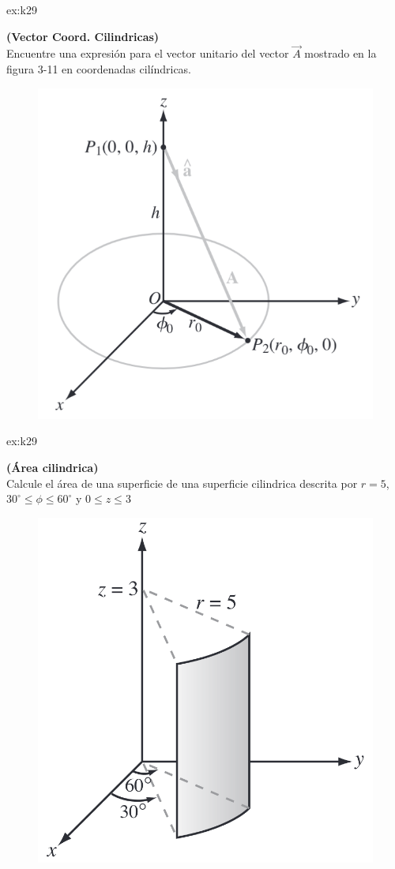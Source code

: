  \begin{multicols}{2}

    \begin{excercise}[][][$\vec{e}_A=\displaystyle{\frac{r_0\vec{e}_r-h\vec{k}}{\sqrt{r_0^2+h^2$}}}]{ex:k29}{ \textbf{(Vector Coord. Cilindricas)}\\
            Encuentre una expresión para el vector unitario del vector $\vec{A}$ mostrado en la figura 3-11 en coordenadas cilíndricas.
            \begin{figure}[H]
                \centering
                \includegraphics[width=0.7\linewidth]{img/01_electric-field/1.png}
            \end{figure}
         }
    \end{excercise}
    
    \begin{excercise}[][][$S=\displaystyle{\frac{5\pi}{2}}$]{ex:k29}{ \textbf{(Área cilindrica)}\\
            Calcule el área de una superficie de una superficie cilindrica descrita por $r=5$, $30^\circ\leq\phi\leq 60^\circ$ y $0\leq z\leq 3$            
            \begin{figure}[H]
                \centering
                \includegraphics[width=0.7\linewidth]{img/01_electric-field/2.png}
            \end{figure}
         }
    \end{excercise}


\end{multicols}
